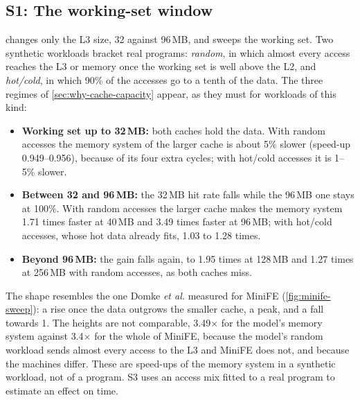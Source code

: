 \subsection{S1: The working-set window}
\label{sec:sim-window}
 changes only the L3 size, 32 against 96\,MB, and sweeps the working set. Two synthetic workloads bracket real programs: \emph{random}, in which almost every access reaches the L3 or memory once the working set is well above the L2, and \emph{hot/cold}, in which 90\% of the accesses go to a tenth of the data. The three regimes of \cref{sec:why-cache-capacity} appear, as they must for workloads of this kind:
\begin{itemize}
  \item \textbf{Working set up to 32\,MB:} both caches hold the data. With random accesses the memory system of the larger cache is about 5\% slower (speed-up 0.949--0.956), because of its four extra cycles; with hot/cold accesses it is 1--5\% slower.
  \item \textbf{Between 32 and 96\,MB:} the 32\,MB hit rate falls while the 96\,MB one stays at 100\%. With random accesses the larger cache makes the memory system 1.71 times faster at 40\,MB and 3.49 times faster at 96\,MB; with hot/cold accesses, whose hot data already fits, 1.03 to 1.28 times.
  \item \textbf{Beyond 96\,MB:} the gain falls again, to 1.95 times at 128\,MB and 1.27 times at 256\,MB with random accesses, as both caches miss.
\end{itemize}
The shape resembles the one Domke \emph{et al.} measured for MiniFE (\cref{fig:minife-sweep}): a rise once the data outgrows the smaller cache, a peak, and a fall towards 1. The heights are not comparable, 3.49$\times$ for the model's memory system against 3.4$\times$ for the whole of MiniFE, because the model's random workload sends almost every access to the L3 and MiniFE does not, and because the machines differ. These are speed-ups of the memory system in a synthetic workload, not of a program. S3 uses an access mix fitted to a real program to estimate an effect on time.

